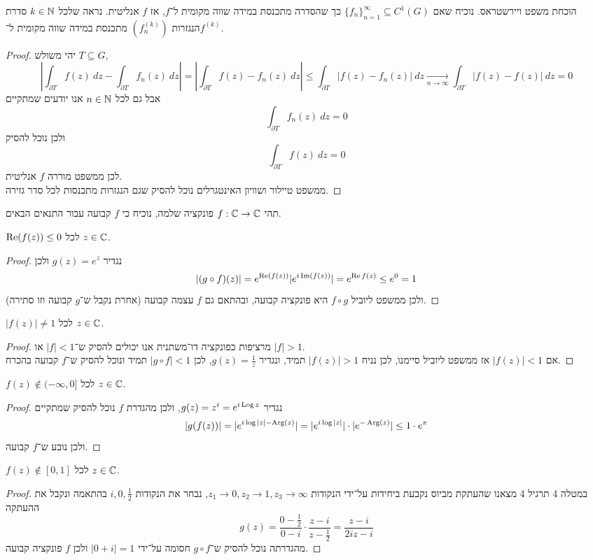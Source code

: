 \question{}
הוכחת משפט ויירשטראס.
נוכיח שאם ${\{f_n\}}_{n = 1}^\infty \subseteq C^1(G)$ כך שהסדרה מתכנסת במידה שווה מקומית ל־$f$, אז $f$ אנליטית.
נראה שלכל $k \in \mathbb{N}$ סדרת הנגזרות $(f_n^{(k)})$ מתכנסת במידה שווה מקומית ל־$f^{(k)}$.
\begin{proof}
	יהי משולש $T \subseteq G$,
	\[
		\left\lvert \int_{\partial T} f(z)\ dz - \int_{\partial T} f_n(z)\ dz \right\rvert
		= \left\lvert \int_{\partial T} f(z) - f_n(z)\ dz \right\rvert
		\le \int_{\partial T} |f(z) - f_n(z)|\ dz 
		\xrightarrow[n \to \infty]{}
		\int_{\partial T} |f(z) - f(z)|\ dz 
		= 0
	\]
	אבל גם לכל $n \in \mathbb{N}$ אנו יודעים שמתקיים
	\[
		\int_{\partial T} f_n(z)\ dz = 0
	\]
	ולכן נוכל להסיק
	\[
		\int_{\partial T} f(z)\ dz = 0
	\]
	לכן ממשפט מוררה $f$ אנליטית. \\
	ממשפט טיילור ושוויון האינטגרלים נוכל להסיק שגם הנגזרות מתכנסות לכל סדר גזירה.
\end{proof}

\question{}
תהי $f : \mathbb{C} \to \mathbb{C}$ פונקציה שלמה, נוכיח כי $f$ קבועה עבור התנאים הבאים.

\subquestion{}
$\operatorname{Re}(f(z)) \le 0$ לכל $z \in \mathbb{C}$.
\begin{proof}
	נגדיר $g(z) = e^z$ ולכן
	\[
		|(g \circ f)(z)|
		= e^{\operatorname{Re}(f(z))} |e^{i\operatorname{Im}(f(z))}|
		= e^{\operatorname{Re} f(z)}
		\le e^0
		= 1
	\]
	ולכן ממשפט ליוביל $f \circ g$ היא פונקציה קבועה, ובהתאם גם $f$ עצמה קבועה (אחרת נקבל ש־$g$ קבועה וזו סתירה).
\end{proof}

\subquestion{}
$|f(z)| \ne 1$ לכל $z \in \mathbb{C}$.
\begin{proof}
	מרציפות כפונקציה דו־משתנית אנו יכולים להסיק ש־$|f| < 1$ או $|f| > 1$. \\
	אם $|f(z)| < 1$ אז ממשפט ליוביל סיימנו, לכן נניח $|f(z)| > 1$ תמיד, ונגדיר $g(z) = \frac{1}{z}$, לכן $|g \circ f| < 1$ תמיד ונוכל להסיק ש־$f$ קבועה בהכרח.
\end{proof}

\subquestion{}
$f(z) \notin (-\infty, 0]$ לכל $z \in \mathbb{C}$. %
\begin{proof}
	נגדיר $g(z) = z^i = e^{i \operatorname{Log} z}$, ולכן מהגדרת $f$ נוכל להסיק שמתקיים
	\[
		|g(f(z))|
		= |e^{i \log|z| - \operatorname{Arg}(z)}|
		= |e^{i \log|z|}| \cdot |e^{-\operatorname{Arg}(z)}|
		\le 1 \cdot e^{\pi}
	\]
	ולכן נובע ש־$f$ קבועה.
\end{proof}

\subquestion{}
$f(z) \notin [0, 1]$ לכל $z \in \mathbb{C}$.
\begin{proof}
	במטלה 4 תרגיל 4 מצאנו שהעתקת מביוס נקבעת ביחידות על־ידי הנקודות $z_1 \to 0, z_2 \to 1, z_3 \to \infty$, נבחר את הנקודות $i, 0, \frac{1}{2}$ בהתאמה ונקבל את ההעתקה
	\[
		g(z)
		= \frac{0 - \frac{1}{2}}{0 - i} \cdot \frac{z - i}{z - \frac{1}{2}}
		= \frac{z - i}{2i z - i}
	\]
	מהגדרתה נוכל להסיק ש־$g \circ f$ חסומה על־ידי $|0 + i| = 1$ ולכן $f$ פונקציה קבועה.
\end{proof}


